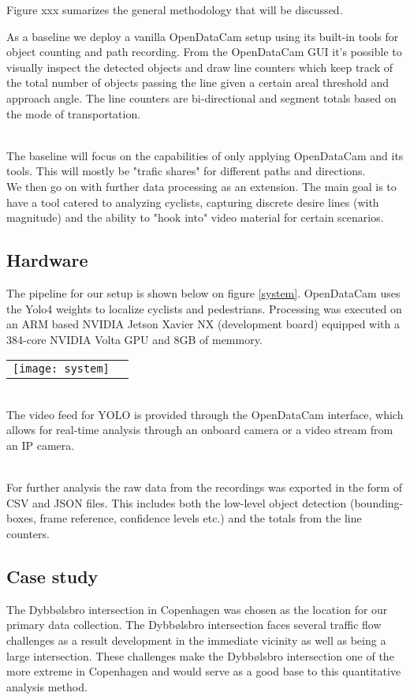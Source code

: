 Figure xxx sumarizes the general methodology that will be discussed. 


As a baseline we deploy a vanilla OpenDataCam setup using its built-in tools for object counting and path recording.
From the OpenDataCam GUI it's possible to visually inspect the detected objects and draw line counters 
which keep track of the total number of objects passing the line given a certain areal threshold and approach angle. 
The line counters are bi-directional and segment totals based on the mode of transportation.

\ \\
The baseline will focus on the capabilities of only applying OpenDataCam and its tools. This will mostly be "trafic shares" for 
different paths and directions. 
\\ 
We then go on with further data processing as an extension. The main goal is to have a tool catered to analyzing cyclists, capturing
discrete desire lines (with magnitude) and the ability to "hook into" video material for certain scenarios.

\subsection{Hardware}
The pipeline for our setup is shown below on figure \ref{system}. OpenDataCam uses the Yolo4 weights to localize cyclists and pedestrians.
Processing was executed on an ARM based NVIDIA Jetson Xavier NX (development board) equipped with a 384-core NVIDIA Volta GPU
and 8GB of memmory. 

\raggedbottom
\noindent
\begin{tabular}{@{}cc}
\texttt{[image: system]} 
\end{tabular}
\label{system}

\ \\
The video feed for YOLO is provided through the OpenDataCam interface, which allows for real-time analysis through an onboard camera
or a video stream from an IP camera. 

\ \\
For further analysis the raw data from the recordings was exported in the form of CSV and JSON files. This includes both the low-level
object detection (bounding-boxes, frame reference, confidence levels etc.) and the totals from the line counters.

\subsection{Case study}
The Dybbølsbro intersection in Copenhagen was chosen as the location for our primary data collection. 
The Dybbølsbro intersection faces several traffic flow challenges as a result development in the immediate vicinity as well as being a large intersection.
These challenges make the Dybbølsbro intersection one of the more extreme in Copenhagen and would serve as a good base to this quantitative analysis method. 

